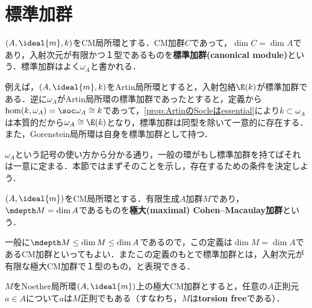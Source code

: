 %
\section{標準加群}

\begin{defi}[標準加群]
	$(A,\ideal{m},k)$をCM局所環とする．CM加群$C$であって，$\dim C=\dim A$であり，入射次元が有限かつ１型であるものを\textbf{標準加群(canonical module)}という．標準加群はよく$\omega_A$と書かれる．
\end{defi}

例えば，$(A,\ideal{m},k)$をArtin局所環とすると，入射包絡$\E(k)$が標準加群である．逆に$\omega_A$がArtin局所環の標準加群であったとすると，定義から$\hom (k,\omega_A)=\soc \omega_A\cong k$であって，\ref{prop:ArtinのSocleはessential}により$k\subset \omega_A$は本質的だから$\omega_A\cong\E(k)$となり，標準加群は同型を除いて一意的に存在する．また，Gorenstein局所環は自身を標準加群として持つ．

$\omega_A$という記号の使い方から分かる通り，一般の環がもし標準加群を持てばそれは一意に定まる．本節ではまずそのことを示し，存在するための条件を決定しよう．

\begin{defi}[極大CM加群]
	$(A,\ideal{m})$をCM局所環とする．有限生成$A$加群$M$であり，$\mdepth M=\dim A$であるものを\textbf{極大(maximal) Cohen--Macaulay加群}という．
\end{defi}

一般に$\mdepth M\leq\dim M\leq\dim A$であるので，この定義は$\dim M=\dim A$であるCM加群といってもよい．またこの定義のもとで標準加群とは，入射次元が有限な極大CM加群で１型のもの，と表現できる．

\begin{prop}
	$M$をNoether局所環$(A,\ideal{m})$上の極大CM加群とすると，任意の$A$正則元$a\in A$について$a$は$M$正則でもある（すなわち，$M$は\textbf{torsion free}である）．
\end{prop}

